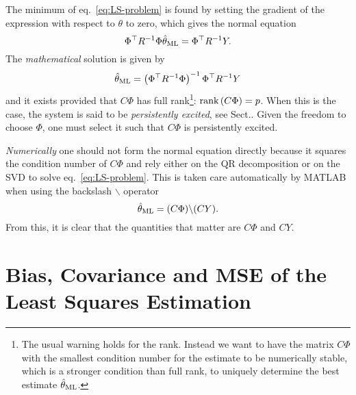 The minimum of eq.~\eqref{eq:LS-problem} is found by setting the gradient of the expression with respect to $\theta$ to zero, which gives the normal equation
\begin{equation*}
  \Phi^\top R^{-1}\Phi \hat{\theta}_\textrm{ML} = \Phi^\top R^{-1}Y.
\end{equation*}
The \emph{mathematical} solution is given by
\begin{equation}
  \label{eq:LS-estimator}
  \hat{\theta}_\textrm{ML} = \left(\Phi^\top R^{-1}\Phi\right)^{-1} \Phi^\top R^{-1}Y
\end{equation}
and it exists provided that $C\Phi$ has full rank\footnote{The usual warning holds for the rank. Instead we want to have the matrix $C\Phi$ with the smallest condition number for the estimate to be numerically stable, which is a stronger condition than full rank, to uniquely determine the best estimate $\hat{\theta}_\textrm{ML}$.}: $\textrm{rank}\left(C\Phi\right) = p$. When this is the case, the system is said to be \emph{persistently excited}, see Sect.. Given the freedom to choose $\Phi$, one must select it such that $C\Phi$ is persistently excited.

\emph{Numerically} one should not form the normal equation directly because it squares the condition number of $C\Phi$ and rely either on the QR decomposition or on the SVD to solve eq.~\eqref{eq:LS-problem}.
This is taken care automatically by MATLAB when using the backslash $\backslash$ operator
\begin{equation}
  \label{eq:LS-numerical-solution}
  \hat{\theta}_\textrm{ML} = (C\Phi) \backslash (CY).
\end{equation}
From this, it is clear that the quantities that matter are $C\Phi$ and $CY$.

\section{Bias, Covariance and MSE of the Least Squares Estimation}
\label{sec:bias-variance-MSE-LS-estimation}

